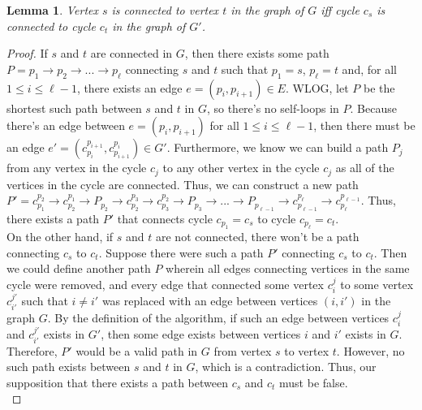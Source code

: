 \documentclass[psamsfonts, 10pt]{amsart}
\newtheorem{lem}[thm]{Lemma}
\theoremstyle{definition}
\theoremstyle{remark}
\numberwithin{equation}{section}
\begin{document}
\begin{lem} Vertex $s$ is connected to vertex $t$ in the graph of $G$ iff cycle $c_s$ is connected to cycle $c_t$ in the graph of $G'$.
\end{lem}
\begin{proof}
If $s$ and $t$ are connected in $G$, then there exists some path $P = p_1 \to p_2 \to ...  \to p_\ell$ connecting $s$ and $t$ such that $p_1 = s$, $p_\ell = t$ and, for all $1 \leq i \leq \ell-1$, there exists an edge $e = (p_i, p_{i+1}) \in E$. WLOG, let $P$ be the shortest such path between $s$ and $t$ in $G$, so there's no self-loops in $P$. Because there's an edge between $e = (p_i, p_{i+1})$ for all $1 \leq i \leq \ell-1$, then there must be an edge $e' =(c_{p_i}^{p_{i+1}}, c_{p_{i+1}}^{p_{i}}) \in G'$. Furthermore, we know we can build a path $P_j$ from any vertex in the cycle $c_{j}$ to any other vertex in the cycle $c_{j}$ as all of the vertices in the cycle are connected. Thus, we can construct a new path $P' = c_{p_1}^{p_{2}} \to  c_{p_{2}}^{p_{1}} \to P_{p_2} \to c_{p_2}^{p_{3}} \to  c_{p_{3}}^{p_{2}} \to P_{p_3} \to ... \to P_{p_{\ell-1}} \to c_{p_{\ell -1}}^{p_{\ell}} \to  c_{p_{\ell}}^{p_{\ell-1}}$. Thus, there exists a path $P'$ that connects cycle $c_{p_1} = c_{s}$ to cycle $c_{p_{\ell}} = c_{t}$.\\

On the other hand, if $s$ and $t$ are not connected, there won't be a path connecting $c_s$ to $c_t$. Suppose there were such a path $P'$ connecting $c_s$ to $c_t$. Then we could define another path $P$ wherein all edges connecting vertices in the same cycle were removed, and every edge that connected some vertex $c_i^j$ to some vertex $c_{i'}^{j'}$ such that $i \neq i'$ was replaced with an edge between vertices $(i, i')$ in the graph $G$. By the definition of the algorithm, if such an edge between vertices $c_i^j$ and $c_{i'}^{j'}$ exists in $G'$, then some edge exists between vertices $i$ and $i'$ exists in $G$. Therefore, $P'$ would be a valid path in $G$ from vertex $s$ to vertex $t$. However, no such path exists between $s$ and $t$ in $G$, which is a contradiction. Thus, our supposition that there exists a path between $c_s$ and $c_t$ must be false. 
\\
\end{proof}
\end{document}

